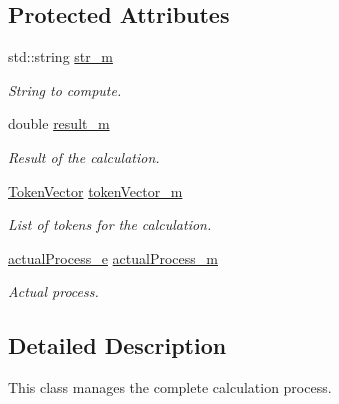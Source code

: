 \subsection*{Protected Attributes}
\begin{DoxyCompactItemize}
\item 
\hypertarget{class_analyze_a5eaf2648206b44a7136f00f6f2aea716}{}std\+::string \hyperlink{class_analyze_a5eaf2648206b44a7136f00f6f2aea716}{str\+\_\+m}\label{class_analyze_a5eaf2648206b44a7136f00f6f2aea716}

\begin{DoxyCompactList}\small\item\em String to compute. \end{DoxyCompactList}\item 
\hypertarget{class_analyze_ac5e2e04f7a6530205899bfc8089e6a1b}{}double \hyperlink{class_analyze_ac5e2e04f7a6530205899bfc8089e6a1b}{result\+\_\+m}\label{class_analyze_ac5e2e04f7a6530205899bfc8089e6a1b}

\begin{DoxyCompactList}\small\item\em Result of the calculation. \end{DoxyCompactList}\item 
\hypertarget{class_analyze_a0cb9f60bf517b50df90aa9669199f61c}{}\hyperlink{token_8h_a8318de25ae453e04997e41e88c9fad7d}{Token\+Vector} \hyperlink{class_analyze_a0cb9f60bf517b50df90aa9669199f61c}{token\+Vector\+\_\+m}\label{class_analyze_a0cb9f60bf517b50df90aa9669199f61c}

\begin{DoxyCompactList}\small\item\em List of tokens for the calculation. \end{DoxyCompactList}\item 
\hypertarget{class_analyze_a41743a35d696fd86ab0e4af616a6cd9a}{}\hyperlink{class_analyze_aee7ac80c3a9b19650f0d3dd3bf8712d9}{actual\+Process\+\_\+e} \hyperlink{class_analyze_a41743a35d696fd86ab0e4af616a6cd9a}{actual\+Process\+\_\+m}\label{class_analyze_a41743a35d696fd86ab0e4af616a6cd9a}

\begin{DoxyCompactList}\small\item\em Actual process. \end{DoxyCompactList}\end{DoxyCompactItemize}


\subsection{Detailed Description}
This class manages the complete calculation process. 

